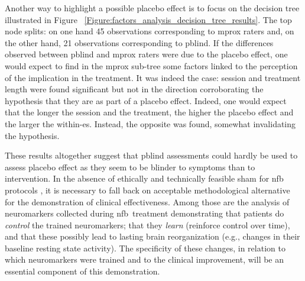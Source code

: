 Another way to highlight a possible placebo effect is to focus on the decision tree illustrated in Figure
~\ref{Figure:factors_analysis_decision_tree_results}.
The top node splits: on one hand 45 observations corresponding to \gls{mprox} raters and, on the other hand, 
21 observations corresponding to \gls{pblind}. If the differences observed between \gls{pblind} and \gls{mprox} raters were 
due to the placebo effect, one would expect to find in the \gls{mprox} sub-tree some factors linked to the perception
of the implication in the treatment. It was indeed the case: session and treatment length were found significant but not in the
direction corroborating the hypothesis that they are as part of a placebo effect. Indeed, one would expect that the
longer the session and the treatment, the higher the placebo effect and the larger the within-\gls{es}. Instead, the opposite was found, 
somewhat invalidating the hypothesis. 

These results altogether suggest that \gls{pblind} assessments could hardly be used to assess placebo effect as they seem to be blinder 
to symptoms than to intervention. In the absence of ethically \citep{Holtmann2014} and technically \citep{Birbaumer1991} feasible sham 
for \gls{nfb} protocols \citep{World-Medical-Association2000}, it is necessary to fall back on acceptable methodological alternative for 
the demonstration of clinical effectiveness. Among those are the analysis of neuromarkers collected during \gls{nfb} treatment demonstrating 
that patients do \emph{control} the trained neuromarkers; that they \emph{learn} (reinforce control over time), and that these possibly 
lead to lasting brain reorganization (e.g., changes in their baseline resting state activity). The specificity of these changes, in relation 
to which neuromarkers were trained and to the clinical improvement, will be an essential component of this demonstration.  

